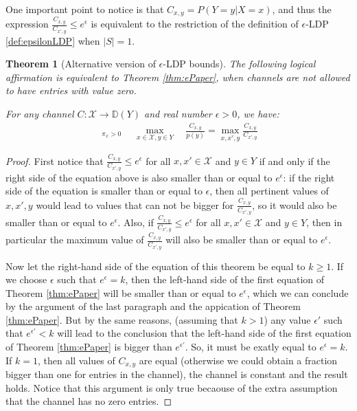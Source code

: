 \documentclass[conference]{IEEEtran}
\newtheorem{theorem}{Theorem}
\newcommand{\X}{\mathcal{X}}
\newcommand{\D}{\mathbb{D}}
\newcommand{\DX}{\mathbb{D}(\mathcal{X})}
\begin{document}
One important point to notice is that $C_{x,y} = P(Y=y|X=x)$, and thus the expression $\frac{C_{x,y}}{C_{x',y}} \leq e^\epsilon$ is equivalent to the restriction of the definition of $\epsilon$-LDP \ref{def:epsilonLDP} when $|S| = 1$.

\begin{theorem}[Alternative version of $\epsilon$-LDP bounds]\label{thm:eMeu} The following logical affirmation is equivalent to Theorem \ref{thm:ePaper}, when channels are not allowed to have entries with value zero.

For any channel $C: \X \rightarrow \D(Y)$ and real number $\epsilon > 0$, we have:
\begin{align*}
\mathop{\sup_{\pi\in\DX:}}_{\pi_x>0}\quad\max_{x\in\X,y\in Y}\quad\frac{C_{x,y}}{p(y)} = \max_{x,x',y}\frac{C_{x,y}}{C_{x',y}}
\end{align*}
\end{theorem}
\begin{proof}
First notice that $\frac{C_{x,y}}{C_{x',y}} \leq e^\epsilon$ for all $x,x'\in \X$ and $y \in Y$ if and only if the right side of the equation above is also smaller than or equal to $e^\epsilon$: if the right side of the equation is smaller than or equal to $\epsilon$, then all pertinent values of $x,x',y$ would lead to values that can not be bigger for $\frac{C_{x,y}}{C_{x',y}}$, so it would also be smaller than or equal to $e^\epsilon$. Also, if $\frac{C_{x,y}}{C_{x',y}} \leq e^\epsilon$ for all $x,x'\in \X$ and $y \in Y$, then in particular the maximum value of $\frac{C_{x,y}}{C_{x',y}}$ will also be smaller than or equal to $e^\epsilon$.

Now let the right-hand side of the equation of this theorem be equal to $k \geq 1$. If we choose $\epsilon$ such that $e^\epsilon = k$, then the left-hand side of the first equation of Theorem \ref{thm:ePaper} will be smaller than or equal to $e^\epsilon$, which we can conclude by the argument of the last paragraph and the appication of Theorem \ref{thm:ePaper}. But by the same reasons, (assuming that $k > 1$) any value $\epsilon'$ such that $e^{\epsilon'} < k$ will lead to the conclusion that the left-hand side of the first equation of Theorem \ref{thm:ePaper} is bigger than $e^{\epsilon'}$. So, it must be exatly equal to $e^\epsilon = k$. If $k=1$, then all values of $C_{x,y}$ are equal (otherwise we could obtain a fraction bigger than one for entries in the channel), the channel is constant and the result holds. Notice that this argument is only true becaouse of the extra assumption that the channel has no zero entries.
\end{proof}
\end{document}
